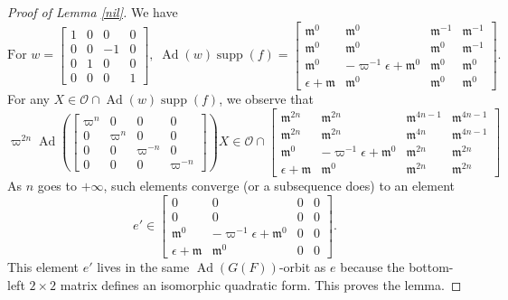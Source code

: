 \documentclass[11pt]{amsart}
\theoremstyle{remark}
\newcommand{\cO}{\mathcal{O}}
\newcommand{\Ad}{\operatorname{Ad}}
\newcommand{\fm}{\mathfrak{m}}
\newcommand{\matr}[1]{\left[\begin{matrix}#1\end{matrix}\right]}
\newcommand{\supp}{\operatorname{supp}}
\begin{document}
\begin{proof}[Proof of Lemma \ref{nil}] We have
\[
\text{For }w=\matr{1&0&0&0\\0&0&-1&0\\0&1&0&0\\0&0&0&1},\;\Ad(w)\supp(f)=
\matr{
	\fm^0&\fm^0&\fm^{-1}&\fm^{-1}\\
	\fm^0&\fm^0&\fm^0&\fm^{-1}\\
	\fm^0&-\varpi^{-1}\epsilon+\fm^0&\fm^0&\fm^0\\
	\epsilon+\fm&\fm^0&\fm^0&\fm^0
}.
\]
For any $X\in\cO\cap\Ad(w)\supp(f)$, we observe that
\[
\varpi^{2n}\Ad(\matr{\varpi^n&0&0&0\\0&\varpi^n&0&0\\0&0&\varpi^{-n}&0\\0&0&0&\varpi^{-n}})X\in\cO\cap
\matr{
	\fm^{2n}&\fm^{2n}&\fm^{4n-1}&\fm^{4n-1}\\
	\fm^{2n}&\fm^{2n}&\fm^{4n}&\fm^{4n-1}\\
	\fm^0&-\varpi^{-1}\epsilon+\fm^0&\fm^{2n}&\fm^{2n}\\
	\epsilon+\fm&\fm^0&\fm^{2n}&\fm^{2n}
}
\]
As $n$ goes to $+\infty$, such elements converge (or a subsequence does) to an element
\[
e'\in
\matr{
	0&0&0&0\\
	0&0&0&0\\
	\fm^0&-\varpi^{-1}\epsilon+\fm^0&0&0\\
	\epsilon+\fm&\fm^0&0&0
}.
\]
This element $e'$ lives in the same $\Ad(G(F))$-orbit as $e$ because the bottom-left $2\times 2$ matrix defines an isomorphic quadratic form. This proves the lemma.
\end{proof} 
\end{document}
